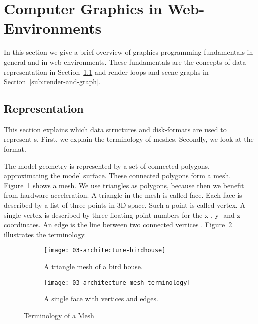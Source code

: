 \documentclass[../../ClassicThesis.tex]{subfiles}
\begin{document}
\section{Computer Graphics in Web-Environments}
\label{sec:cg-web}

In this section we give a brief overview of graphics programming
fundamentals in general and in web-environments. These fundamentals
are the concepts of {\threedmodel} data representation in
Section~\ref{sub:model-representation} and render loops and scene
graphs in Section~\ref{sub:render-and-graph}.

\subsection{{\threedmodel} Representation}
\label{sub:model-representation}

This section explains which data structures and disk-formats are used
to represent {\threedmodel}s. First, we explain the terminology of
meshes. Secondly, we look at the {\stlfile} format.

The model geometry is represented by a set of connected polygons,
approximating the model surface. These connected polygons form a mesh.
Figure~\ref{fig:term-mesh:mesh} shows a mesh. We use triangles as
polygons, because then we benefit from hardware acceleration. A
triangle in the mesh is called face. Each face is described by a list
of three points in 3D-space. Such a point is called vertex. A single
vertex is described by three floating point numbers for the x-, y- and
z-coordinates. An edge is the line between two connected vertices
\cite[p.~3]{cg-intro}. Figure~\ref{fig:term-mesh:face} illustrates the
terminology.

\begin{figure}[h]
  \centering
  \begin{subfigure}[b]{0.49\textwidth}
    \centering
    \texttt{[image: 03-architecture-birdhouse]}
    \caption{A triangle mesh of a bird house.}
    \label{fig:term-mesh:mesh}
  \end{subfigure}
  \begin{subfigure}[b]{0.49\textwidth}
    \centering
    \texttt{[image: 03-architecture-mesh-terminology]}
    \caption{A single face with vertices and edges.}
    \label{fig:term-mesh:face}
  \end{subfigure}
  \caption{Terminology of a Mesh}
  \label{fig:term-mesh}
\end{figure}
\end{document}
